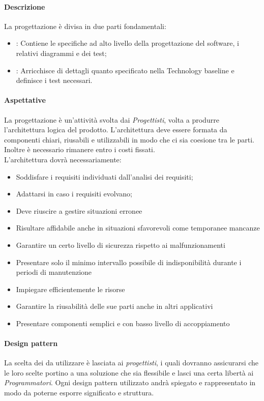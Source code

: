 \documentclass[../norme_di_progetto.tex]{subfiles}
\begin{document}
    \paragraph{Descrizione}
    La progettazione è divisa in due parti fondamentali:
    \begin{itemize}
        \item {}: Contiene le specifiche ad alto livello della progettazione del software, i relativi diagrammi  e dei test;
        \item {}: Arricchisce di dettagli quanto specificato nella Technology baseline e definisce i test necessari.
    \end{itemize}

    \paragraph{Aspettative}
    La progettazione è un'attività svolta dai \emph{Progettisti}, volta a produrre l'architettura logica del prodotto. L'architettura deve essere formata da componenti chiari, riusabili e utilizzabili in modo che ci sia coesione tra le parti. Inoltre è necessario rimanere entro i costi fissati.\\
    L'architettura dovrà necessariamente: 
    \begin{itemize}
        \item Soddisfare i requisiti individuati dall'analisi dei requisiti;
        \item Adattarsi in caso i requisiti evolvano;
        \item Deve riuscire a gestire situazioni erronee
        \item Risultare affidabile anche in situazioni sfavorevoli come temporanee mancanze
        \item Garantire un certo livello di sicurezza rispetto ai malfunzionamenti
        \item Presentare solo il minimo intervallo possibile di indisponibilità durante i periodi di manutenzione
        \item Impiegare efficientemente le risorse
        \item Garantire la riusabilità delle sue parti anche in altri applicativi
        \item Presentare componenti semplici e con basso livello di accoppiamento
    \end{itemize}
 
    \paragraph{Design pattern}
    La scelta dei  da utilizzare è lasciata ai \emph{progettisti}, i quali dovranno assicurarsi che le loro scelte portino a una soluzione che sia flessibile e lasci una certa libertà ai \emph{Programmatori}. Ogni design pattern utilizzato andrà spiegato e rappresentato in modo da poterne esporre significato e struttura.
\end{document}
